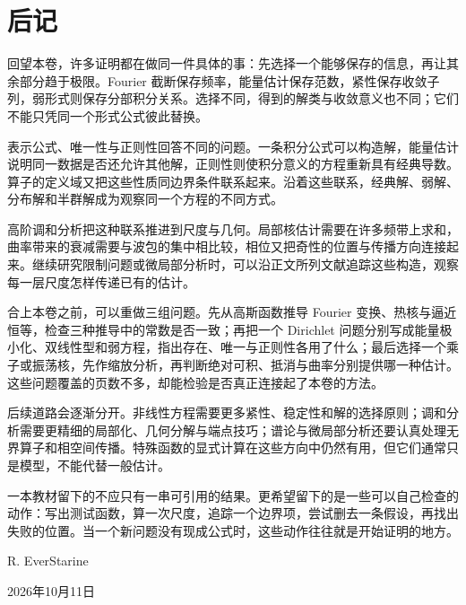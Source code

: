 \chapter*{后记}

回望本卷，许多证明都在做同一件具体的事：先选择一个能够保存的信息，再让其余部分趋于极限。Fourier 截断保存频率，能量估计保存范数，紧性保存收敛子列，弱形式则保存分部积分关系。选择不同，得到的解类与收敛意义也不同；它们不能只凭同一个形式公式彼此替换。

\ProseParagraphBreak

表示公式、唯一性与正则性回答不同的问题。一条积分公式可以构造解，能量估计说明同一数据是否还允许其他解，正则性则使积分意义的方程重新具有经典导数。算子的定义域又把这些性质同边界条件联系起来。沿着这些联系，经典解、弱解、分布解和半群解成为观察同一个方程的不同方式。

\ProseParagraphBreak

高阶调和分析把这种联系推进到尺度与几何。局部核估计需要在许多频带上求和，曲率带来的衰减需要与波包的集中相比较，相位又把奇性的位置与传播方向连接起来。继续研究限制问题或微局部分析时，可以沿正文所列文献追踪这些构造，观察每一层尺度怎样传递已有的估计。

\ProseParagraphBreak

合上本卷之前，可以重做三组问题。先从高斯函数推导 Fourier 变换、热核与逼近恒等，检查三种推导中的常数是否一致；再把一个 Dirichlet 问题分别写成能量极小化、双线性型和弱方程，指出存在、唯一与正则性各用了什么；最后选择一个乘子或振荡核，先作缩放分析，再判断绝对可积、抵消与曲率分别提供哪一种估计。这些问题覆盖的页数不多，却能检验是否真正连接起了本卷的方法。

\ProseParagraphBreak

后续道路会逐渐分开。非线性方程需要更多紧性、稳定性和解的选择原则；调和分析需要更精细的局部化、几何分解与端点技巧；谱论与微局部分析还要认真处理无界算子和相空间传播。特殊函数的显式计算在这些方向中仍然有用，但它们通常只是模型，不能代替一般估计。

\ProseParagraphBreak

一本教材留下的不应只有一串可引用的结果。更希望留下的是一些可以自己检查的动作：写出测试函数，算一次尺度，追踪一个边界项，尝试删去一条假设，再找出失败的位置。当一个新问题没有现成公式时，这些动作往往就是开始证明的地方。

\bigskip
\begin{flushright}
R. EverStarine

2026年10月11日
\end{flushright}
